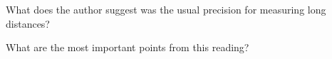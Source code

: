 \documentclass[nooutcomes]{ximera}
\begin{document}
\begin{question}
What does the author suggest was the usual precision for measuring long distances?
\begin{multipleChoice}
\end{multipleChoice}
\end{question}


\begin{question}
What are the most important points from this reading?
\begin{freeResponse}
\end{freeResponse}

\end{question}
\end{document}
